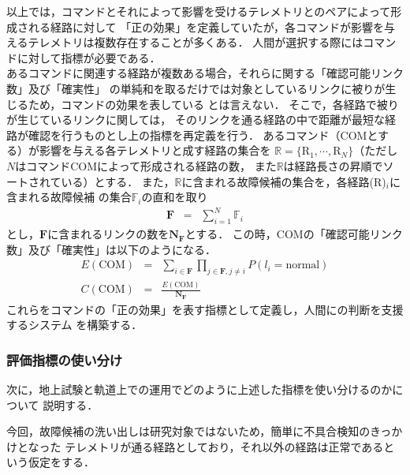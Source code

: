 \documentclass[11pt]{article}
\begin{document}
以上では，コマンドとそれによって影響を受けるテレメトリとのペアによって形成される経路に対して
「正の効果」を定義していたが，各コマンドが影響を与えるテレメトリは複数存在することが多くある．
人間が選択する際にはコマンドに対して指標が必要である．\\
あるコマンドに関連する経路が複数ある場合，それらに関する「確認可能リンク数」及び「確実性」
の単純和を取るだけでは対象としているリンクに被りが生じるため，コマンドの効果を表している
とは言えない．
そこで，各経路で被りが生じているリンクに関しては，
そのリンクを通る経路の中で距離が最短な経路が確認を行うものとし上の指標を再定義を行う．
あるコマンド（COMとする）が影響を与える各テレメトリと成す経路の集合を
$\mathbb{R} = \{ \text{R}_1, \cdots ,\text{R}_{N} \}$（ただし$N$はコマンドCOMによって形成される経路の数，
また$\mathbb{R}$は経路長さの昇順でソートされている）とする．
また，$\mathbb{R}$に含まれる故障候補の集合を，各経路(R)$_i$に含まれる故障候補
の集合$\mathbb{F}_i$の直和を取り%
\begin{eqnarray}
    \mathbf{F} &=& \sum_{i=1}^N \mathbb{F}_i
\end{eqnarray}
とし，$\mathbf{F}$に含まれるリンクの数を$\mathbf{N_F}$とする．
この時，COMの「確認可能リンク数」及び「確実性」は以下のようになる．
\begin{eqnarray}
   E(\text{COM})  &=&\sum_{i\in \mathbf{F}} \prod_{j\in \mathbf{F}, j\neq i} P(l_i=\text{normal})  \\
   C(\text{COM})  &=& \frac{E(\text{COM})}{\mathbf{N_F}}
\end{eqnarray}
これらをコマンドの「正の効果」を表す指標として定義し，人間にの判断を支援するシステム
を構築する．

\subsubsection{評価指標の使い分け}
次に，地上試験と軌道上での運用でどのように上述した指標を使い分けるのかについて
説明する．

今回，故障候補の洗い出しは研究対象ではないため，簡単に不具合検知のきっかけとなった
テレメトリが通る経路としており，それ以外の経路は正常であるという仮定をする．
\end{document}
